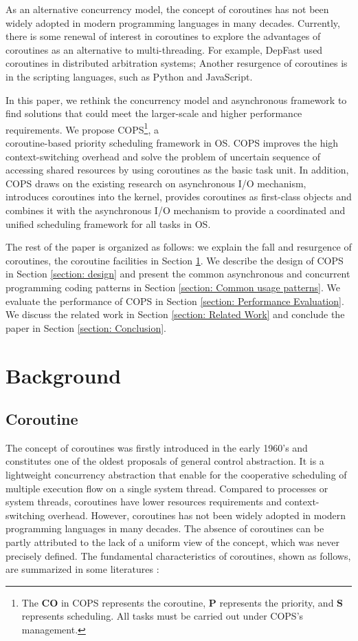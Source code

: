 \documentclass[sigconf,review,anonymous]{acmart}
\begin{document}
As an alternative concurrency model, the concept of coroutines has not been widely adopted in modern programming languages in many decades. Currently, there is some renewal of interest in coroutines to explore the advantages of coroutines as an alternative to multi-threading. For example, DepFast \cite{luo_depfast_nodate} used coroutines in distributed arbitration systems; Another resurgence of coroutines is in the scripting languages, such as Python and JavaScript.

In this paper, we rethink the concurrency model and asynchronous framework to find solutions that could meet the larger-scale and higher performance requirements. We propose COPS\footnote{The \textbf{CO} in COPS represents the coroutine, \textbf{P} represents the priority, and \textbf{S} represents scheduling. All tasks must be carried out under COPS's management.}, a \\coroutine-based priority scheduling framework in OS. COPS improves the high context-switching overhead and solve the problem of uncertain sequence of accessing shared resources by using coroutines as the basic task unit. In addition, COPS draws on the existing research on asynchronous I/O mechanism, introduces coroutines into the kernel, provides coroutines as first-class objects and combines it with the asynchronous I/O mechanism to provide a coordinated and unified scheduling framework for all tasks in OS. 

The rest of the paper is organized as follows: we explain the fall and resurgence of coroutines, the coroutine facilities in Section \ref{section: Background}. We describe the design of COPS in Section \ref{section: design} and present the common asynchronous and concurrent programming coding patterns in Section \ref{section: Common usage patterns}. We evaluate the performance of COPS in Section \ref{section: Performance Evaluation}. We discuss the related work in Section \ref{section: Related Work} and conclude the paper in Section \ref{section: Conclusion}.


\section{Background}
\label{section: Background}

\subsection{Coroutine}

The concept of coroutines was firstly introduced in the early 1960's and constitutes one of the oldest proposals of general control abstraction. It is a lightweight concurrency abstraction that enable for the cooperative scheduling of multiple execution flow on a single system thread. Compared to processes or system threads, coroutines have lower resources requirements and context-switching overhead. However, coroutines has not been widely adopted in modern programming languages in many decades. The absence of coroutines can be partly attributed to the lack of a uniform view of the concept, which was never precisely defined. The fundamental characteristics of coroutines, shown as follows, are summarized in some literatures \cite{1980Coroutines}: 
\end{document}

